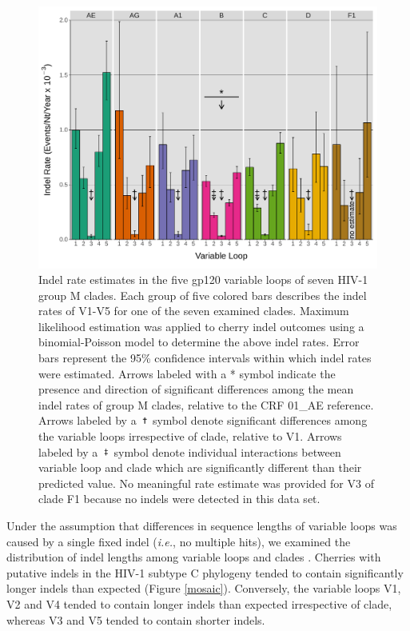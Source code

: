 \documentclass[12pt]{article}
\newcommand*{\doubledag}[2]{\includegraphics[height=#2,width=#1, trim={1cm 5cm 1cm 3cm }, clip]{doubledag-symbol.pdf}}
\newcommand*{\singledag}[2]{\includegraphics[height=#2,width=#1, trim={1cm 5cm 1cm 3cm }, clip]{singledag-symbol.pdf}}
\begin{document}
\begin{figure}[htbp]
    \centering
    \includegraphics[width=.85\textwidth]{indel-rates}
    \caption{ 
    Indel rate estimates in the five gp120 variable loops of seven HIV-1 group M clades. 
    Each group of five colored bars describes the indel rates of V1-V5 for one of the seven examined clades. 
    Maximum likelihood estimation was applied to cherry indel outcomes using a binomial-Poisson model to determine the above indel rates. 
    Error bars represent the 95\% confidence intervals within which indel rates were estimated. 
    Arrows labeled with a * symbol indicate the presence and direction of significant differences among the mean indel rates of group M clades, relative to the CRF 01\_AE reference. 
    Arrows labeled by a \protect\singledag{2.9mm}{2.8mm} symbol denote significant differences among the variable loops irrespective of clade, relative to V1.  
    Arrows labeled by a \protect\doubledag{2.9mm}{2.8mm} symbol denote individual interactions between variable loop and clade which are significantly different than their predicted value.
    No meaningful rate estimate was provided for V3 of clade F1 because no indels were detected in this data set.   
    }
    \label{indel-rates}
\end{figure}




Under the assumption that differences in sequence lengths of variable loops was caused by a single fixed indel (\textit{i.e.}, no multiple hits), we examined the distribution of indel lengths among variable loops and clades .
Cherries with putative indels in the HIV-1 subtype C phylogeny tended to contain significantly longer indels than expected (Figure \ref{mosaic}).
Conversely, the variable loops V1, V2 and V4 tended to contain longer indels than expected irrespective of clade, whereas V3 and V5 tended to contain shorter indels.
\end{document}
